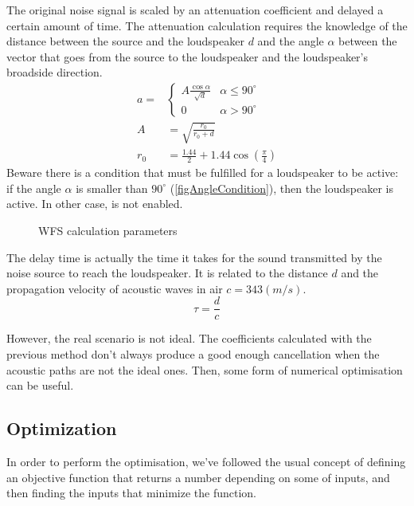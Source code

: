 The original noise signal is scaled by an attenuation coefficient and delayed a certain amount of time. The attenuation calculation requires the knowledge of the distance between the source and the loudspeaker $d$ and the angle $\alpha$ between the vector that goes from the source to the loudspeaker and the loudspeaker's broadside direction.
\begin{equation}
	\begin{aligned}
		a = 
		&\begin{cases}
		A\frac{\cos\alpha}{\sqrt{d}} & \alpha \leq 90^\circ \\
		0 & \alpha > 90^\circ
		\end{cases}
		\\
		A &= \sqrt{\frac{r_0}{r_0 + d}}\\
		r_0 &= \frac{1.44}{2} + 1.44 \cos\left( \frac{\pi}{4} \right)
	\end{aligned}
	\label{WFScalcEq}
\end{equation}
Beware there is a condition that must be fulfilled for a loudspeaker to be active: if the angle $\alpha$ is smaller than $90^\circ$ (\autoref{figAngleCondition}), then the loudspeaker is active. In other case, is not enabled.

%	
\begin{figure}
	\centering
	\def\svgwidth{0.4\columnwidth}
	\graphicspath{{Img/}}
	
	\caption[WFS calculation parameters]{WFS calculation parameters}
	\label{figAngleCondition}
\end{figure}

The delay time is actually the time it takes for the sound transmitted by the noise source to reach the loudspeaker. It is related to the distance $d$ and the propagation velocity of acoustic waves in air $c = 343 (m/s)$.
\begin{equation}
	\tau = \frac{d}{c} \label{WFScalcEqDelay}
\end{equation}

However, the real scenario is not ideal. The coefficients calculated with the previous method don't always produce a good enough cancellation when the acoustic paths are not the ideal ones. Then, some form of numerical optimisation can be useful.

\subsection{Optimization}
In order to perform the optimisation, we've followed the usual concept of defining an objective function that returns a number depending on some of inputs, and then finding the inputs that minimize the function.


